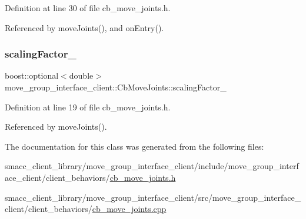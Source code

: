 Definition at line 30 of file cb\+\_\+move\+\_\+joints.\+h.



Referenced by move\+Joints(), and on\+Entry().

\mbox{\label{classmove__group__interface__client_1_1CbMoveJoints_a05f9ed8765ddb6e02b108a790bdf8f88}} 
\subsubsection{\texorpdfstring{scaling\+Factor\+\_\+}{scalingFactor\_}}
{\footnotesize\ttfamily boost\+::optional$<$double$>$ move\+\_\+group\+\_\+interface\+\_\+client\+::\+Cb\+Move\+Joints\+::scaling\+Factor\+\_\+}



Definition at line 19 of file cb\+\_\+move\+\_\+joints.\+h.



Referenced by move\+Joints().



The documentation for this class was generated from the following files\+:\begin{DoxyCompactItemize}
\item 
smacc\+\_\+client\+\_\+library/move\+\_\+group\+\_\+interface\+\_\+client/include/move\+\_\+group\+\_\+interface\+\_\+client/client\+\_\+behaviors/\hyperlink{cb__move__joints_8h}{cb\+\_\+move\+\_\+joints.\+h}\item 
smacc\+\_\+client\+\_\+library/move\+\_\+group\+\_\+interface\+\_\+client/src/move\+\_\+group\+\_\+interface\+\_\+client/client\+\_\+behaviors/\hyperlink{cb__move__joints_8cpp}{cb\+\_\+move\+\_\+joints.\+cpp}\end{DoxyCompactItemize}
